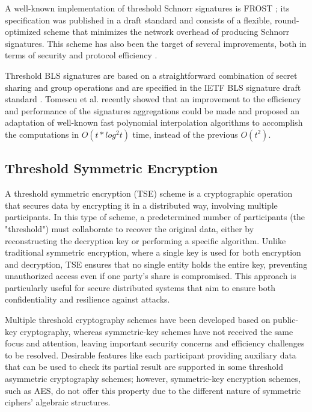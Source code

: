 A well-known implementation of threshold Schnorr signatures is FROST \cite{frost}; its specification was published in a draft standard \cite{frostdraft} and consists of a flexible, round-optimized scheme that minimizes the network overhead of producing Schnorr signatures. This scheme has also been the target of several improvements, both in terms of security and protocol efficiency \cite{frost3,frost3plus}.

Threshold BLS signatures are based on a straightforward combination of secret sharing and group operations and are specified in the IETF BLS signature draft standard \cite{blsdraft}. Tomescu et al. \cite{blsimproved} recently showed that an improvement to the efficiency and performance of the signatures aggregations could be made and proposed an adaptation of well-known fast polynomial interpolation algorithms to accomplish the computations in $O(t*log^2t)$ time, instead of the previous $O(t^2)$.

\subsection{Threshold Symmetric Encryption} \label{subsec:threshold-encryption}

A threshold symmetric encryption (TSE) scheme is a cryptographic operation that secures data by encrypting it in a distributed way, involving multiple participants. In this type of scheme, a predetermined number of participants (the "threshold") must collaborate to recover the original data, either by reconstructing the decryption key or performing a specific algorithm. Unlike traditional symmetric encryption, where a single key is used for both encryption and decryption, TSE ensures that no single entity holds the entire key, preventing unauthorized access even if one party's share is compromised. This approach is particularly useful for secure distributed systems that aim to ensure both confidentiality and resilience against attacks.

Multiple threshold cryptography schemes have been developed based on public-key cryptography, whereas symmetric-key schemes have not received the same focus and attention, leaving important security concerns and efficiency challenges to be resolved. Desirable features like each participant providing auxiliary data that can be used to check its partial result are supported in some threshold asymmetric cryptography schemes; however, symmetric-key encryption schemes, such as AES, do not offer this property due to the different nature of symmetric ciphers' algebraic structures.


